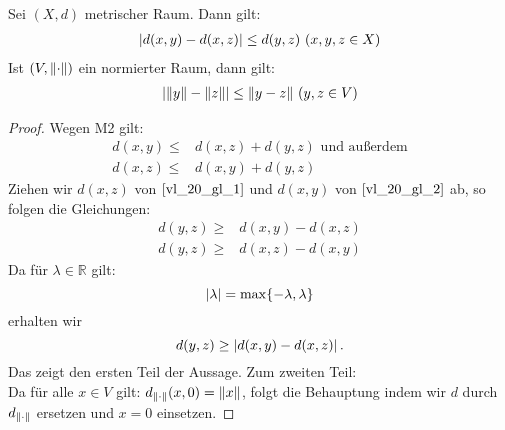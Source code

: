 \begin{Proposition}{%
	Sei $(X,d)$ metrischer Raum. Dann gilt:
	\begin{align*}
		\abs{d(x,y)- d(x,z)} \leq d(y,z) \text{ } (x,y,z \in X)
	\end{align*}
	Ist $(V, \norm{\cdot})$ ein normierter Raum, dann gilt:
	\begin{align*}
		\abs{\norm{y} - \norm{z} } \leq \norm{y -z} \text{ } (y, z \in V)
	\end{align*}
}\end{Proposition}

\begin{proof}
	Wegen M2 gilt:
	\begin{align} \label{vl_20_gl_1}
		d(x,y) \leq & d(x,z) + d(y,z) \text{ und außerdem} \\
		d(x,z) \leq & d(x,y) + d(y,z) \label{vl_20_gl_2}
	\end{align}
	Ziehen wir $d(x,z)$ von $\ref{vl_20_gl_1}$ und $d(x,y)$ von $\ref{vl_20_gl_2}$ ab, so folgen die Gleichungen:
	\begin{align*}
		d(y,z) \geq & d(x,y) - d(x,z) \\
		d(y,z) \geq & d(x,z) - d(x,y) 
	\end{align*}
	Da für $\lambda \in \mathbb{R}$ gilt:
		$$
			\abs{\lambda} = 
				\max\{-\lambda, \lambda\}
		$$
		erhalten wir
		$$
			d(y,z) \geq \abs{d(x,y) - d(x,z)}\,.
		$$
		Das zeigt den ersten Teil der Aussage. Zum zweiten Teil:\\
		Da für alle $x \in V$ gilt: $d_{\norm{\cdot}} (x,0) = \norm{x}$, 
		folgt die Behauptung indem wir $d$ durch $d_{\norm{\cdot}}$ ersetzen und 
		$x = 0$ einsetzen.
\end{proof}
